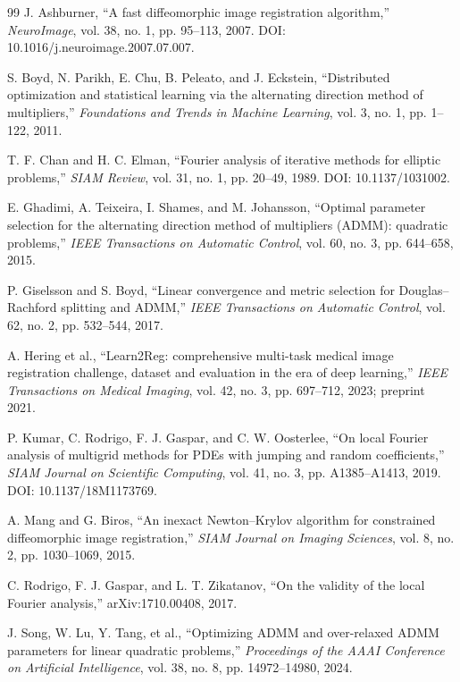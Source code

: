 \documentclass[11pt]{article}
\theoremstyle{definition}
\begin{document}
\begin{thebibliography}{99}
J. Ashburner,
``A fast diffeomorphic image registration algorithm,''
\emph{NeuroImage}, vol. 38, no. 1, pp. 95--113, 2007.
DOI: 10.1016/j.neuroimage.2007.07.007.

S. Boyd, N. Parikh, E. Chu, B. Peleato, and J. Eckstein,
``Distributed optimization and statistical learning via the alternating direction method of multipliers,''
\emph{Foundations and Trends in Machine Learning}, vol. 3, no. 1, pp. 1--122, 2011.

T. F. Chan and H. C. Elman,
``Fourier analysis of iterative methods for elliptic problems,''
\emph{SIAM Review}, vol. 31, no. 1, pp. 20--49, 1989.
DOI: 10.1137/1031002.

E. Ghadimi, A. Teixeira, I. Shames, and M. Johansson,
``Optimal parameter selection for the alternating direction method of multipliers (ADMM): quadratic problems,''
\emph{IEEE Transactions on Automatic Control}, vol. 60, no. 3, pp. 644--658, 2015.

P. Giselsson and S. Boyd,
``Linear convergence and metric selection for Douglas--Rachford splitting and ADMM,''
\emph{IEEE Transactions on Automatic Control}, vol. 62, no. 2, pp. 532--544, 2017.

A. Hering et al.,
``Learn2Reg: comprehensive multi-task medical image registration challenge, dataset and evaluation in the era of deep learning,''
\emph{IEEE Transactions on Medical Imaging}, vol. 42, no. 3, pp. 697--712, 2023; preprint 2021.

P. Kumar, C. Rodrigo, F. J. Gaspar, and C. W. Oosterlee,
``On local Fourier analysis of multigrid methods for PDEs with jumping and random coefficients,''
\emph{SIAM Journal on Scientific Computing}, vol. 41, no. 3, pp. A1385--A1413, 2019.
DOI: 10.1137/18M1173769.

A. Mang and G. Biros,
``An inexact Newton--Krylov algorithm for constrained diffeomorphic image registration,''
\emph{SIAM Journal on Imaging Sciences}, vol. 8, no. 2, pp. 1030--1069, 2015.

C. Rodrigo, F. J. Gaspar, and L. T. Zikatanov,
``On the validity of the local Fourier analysis,''
arXiv:1710.00408, 2017.

J. Song, W. Lu, Y. Tang, et al.,
``Optimizing ADMM and over-relaxed ADMM parameters for linear quadratic problems,''
\emph{Proceedings of the AAAI Conference on Artificial Intelligence}, vol. 38, no. 8, pp. 14972--14980, 2024.


\end{thebibliography}
\end{document}
